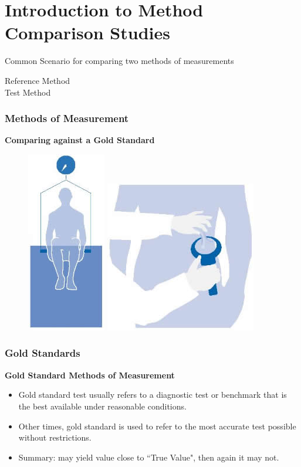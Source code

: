\documentclass[compress]{beamer}        %
\begin{document}
		\section[Intro to MCS]{Introduction to Method Comparison Studies}
\begin{frame}
	\large
Common Scenario for comparing two methods of measurements	\begin{description}
		\item[Reference Method] 
		\item[Test Method]
	\end{description}
\end{frame}
\begin{frame}
	\frametitle{Methods of Measurement}
	\textbf{Comparing against a Gold Standard}
	\begin{figure}
		\centering
		\includegraphics[width=0.18\linewidth]{images/watertest}
		\includegraphics[width=0.36\linewidth]{images/calipers}
	\end{figure}
	
\end{frame}
\begin{frame}
	\frametitle{Gold Standards}
	\large
	\vspace{-1.3cm}
	\textbf{Gold Standard Methods of Measurement}
	\begin{itemize}
		\item	Gold standard test usually refers to a diagnostic test or benchmark that is the best available under reasonable conditions.
		
		
		\item	Other times, gold standard is used to refer to the most accurate test possible without restrictions.
		\item Summary: may yield value close to ``True Value", then again it may not.
	\end{itemize}
\end{frame}
\end{document}
